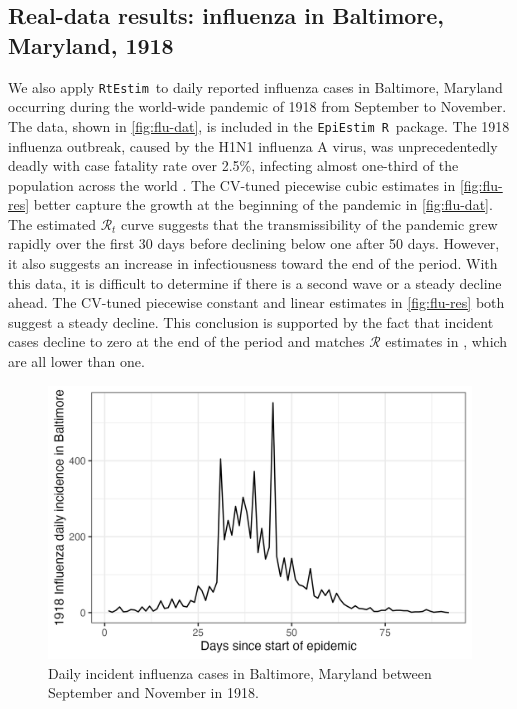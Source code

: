 \documentclass[10pt,letterpaper]{article}
\newcommand{\R}{\texttt{R}}
\def\RtEstim{\texttt{RtEstim}}
\def\EpiEstim{\texttt{EpiEstim}}
\def\calR{\mathcal{R}}
\newcommand{\citep}[1]{\cite{#1}}
\begin{document}
\subsection{Real-data results: influenza in Baltimore, Maryland, 1918}

We also apply \RtEstim\ to daily reported influenza cases in Baltimore, Maryland
occurring during the world-wide pandemic of 1918 from September to November. The
data, shown in \autoref{fig:flu-dat}, is included in the \EpiEstim\ \R\ package.
The 1918 influenza outbreak, caused by the H1N1 influenza A virus, was
unprecedentedly deadly with case fatality rate over 2.5\%, infecting almost
one-third of the population across the world \citep{taubenberger20061918}. The
CV-tuned piecewise cubic estimates in \autoref{fig:flu-res} better capture the
growth at the beginning of the pandemic in \autoref{fig:flu-dat}. The estimated
$\calR_t$ curve suggests that the transmissibility of the pandemic grew rapidly
over the first 30 days before declining below one after 50 days. However, it
also suggests an increase in infectiousness toward the end of the period. With
this data, it is difficult to determine if there is a second wave or a steady
decline ahead. The CV-tuned piecewise constant and linear estimates in
\autoref{fig:flu-res} both suggest a steady decline. This conclusion is
supported by the fact that incident cases decline to zero at the end of the
period and matches $\calR$ estimates in \cite{cori2013new}, which are all lower
than one.

\begin{figure}[!h]
  \centering
  \includegraphics[width=0.9\linewidth]{fig/flu_dat.png}
  \caption{Daily incident influenza cases in Baltimore, Maryland between September 
  and November in 1918.} 
  \label{fig:flu-dat}
\end{figure} 
\end{document}

